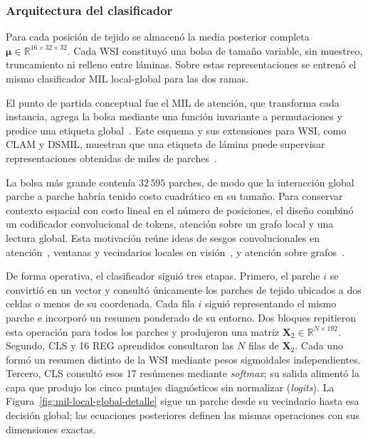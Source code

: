 \subsubsection{Arquitectura del clasificador}

Para cada posición de tejido se almacenó la media posterior completa
\(\boldsymbol{\mu}\in\mathbb{R}^{16\times32\times32}\). Cada WSI constituyó
una bolsa de tamaño variable, sin muestreo, truncamiento ni relleno entre
láminas. Sobre estas representaciones se entrenó el mismo clasificador MIL
local-global para las dos ramas.

El punto de partida conceptual fue el MIL de atención, que transforma cada
instancia, agrega la bolsa mediante una función invariante a permutaciones y
predice una etiqueta global~\cite{ilse_attention_2018}. Este esquema y sus
extensiones para WSI, como CLAM y DSMIL, muestran que una etiqueta de lámina
puede supervisar representaciones obtenidas de miles de
parches~\cite{lu_dataefficient_2021,li_dualstream_2021}.

La bolsa más grande contenía \(32\,595\) parches, de modo que la interacción
global parche a parche habría tenido costo cuadrático en su tamaño. Para
conservar contexto espacial con costo lineal en el número de posiciones, el
diseño combinó un codificador convolucional de tokens, atención sobre un grafo
local y una lectura global. Esta motivación reúne ideas de sesgos
convolucionales en atención~\cite{wu_cvt_2021}, ventanas y vecindarios locales
en visión~\cite{liu_swin_2021,hassani_neighborhood_2023}, y atención sobre
grafos~\cite{velickovic_graph_2018}.

De forma operativa, el clasificador siguió tres etapas. Primero, el parche
\(i\) se convirtió en un vector y consultó únicamente los parches de tejido
ubicados a dos celdas o menos de su coordenada. Cada fila \(i\) siguió
representando el mismo parche e incorporó un resumen ponderado de su entorno.
Dos bloques repitieron esta operación para
todos los parches y produjeron una matriz
\(\mathbf X_2\in\mathbb R^{N\times192}\). Segundo, CLS y 16 REG aprendidos consultaron las \(N\) filas de
\(\mathbf X_2\). Cada uno formó un
resumen distinto de la WSI mediante pesos sigmoidales independientes. Tercero,
CLS consultó esos 17 resúmenes mediante \emph{softmax}; su salida alimentó la
capa que produjo los cinco puntajes diagnósticos sin normalizar
(\emph{logits}). La
Figura~\ref{fig:mil-local-global-detalle} sigue un parche desde su vecindario
hasta esa decisión global; las ecuaciones posteriores definen las mismas
operaciones con sus dimensiones exactas.

